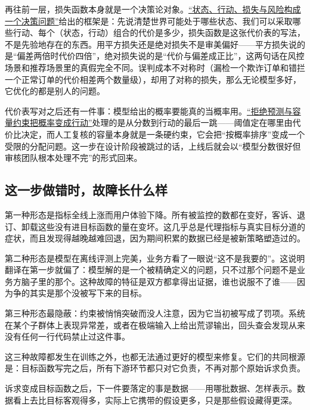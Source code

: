 再往前一层，损失函数本身就是一个决策论对象。\hyperref[sec:11-Mathematical-Statistics/07-Statistical-Decision-and-Reliable-Prediction/01]{``状态、行动、损失与风险构成一个决策问题''}给出的框架是：先说清楚世界可能处于哪些状态、我们可以采取哪些行动、每个（状态，行动）组合的代价是多少，损失函数是这张代价表的写法，不是先验地存在的东西。用平方损失还是绝对损失不是审美偏好——平方损失说的是``偏差两倍时代价四倍''，绝对损失说的是``代价与偏差成正比''，这两句话在风控场景和推荐场景里的真假完全不同。误判成本不对称时（漏检一个欺诈订单和错拦一个正常订单的代价相差两个数量级），却用了对称的损失，那么无论模型多好，它优化的都是别人的问题。

代价表写对之后还有一件事：模型给出的概率要能真的当概率用。\hyperref[sec:11-Mathematical-Statistics/07-Statistical-Decision-and-Reliable-Prediction/06]{``拒绝预测与容量约束把概率变成行动''}处理的是从分数到行动的最后一跳——阈值定在哪里由代价比决定，而人工复核的容量本身就是一条硬约束，它会把``按概率排序''变成一个受限的分配问题。这一步在设计阶段被跳过的话，上线后就会以``模型分数很好但审核团队根本处理不完''的形式回来。

\subsection{这一步做错时，故障长什么样}

第一种形态是指标全线上涨而用户体验下降。所有被监控的数都在变好，客诉、退订、卸载这些没有进目标函数的量在变坏。这几乎总是代理指标与真实目标分道的症状，而且发现得越晚越难回退，因为期间积累的数据已经是被新策略塑造过的。

第二种形态是模型在离线评测上完美，业务方看了一眼说``这不是我要的''。这说明翻译在第一步就偏了：模型解的是一个被精确定义的问题，只不过那个问题不是业务方脑子里的那个。这种故障的特征是双方都拿得出证据，谁也说服不了谁——因为争的其实是那个没被写下来的目标。

第三种形态最隐蔽：约束被悄悄突破而没人注意，因为它当初被写成了罚项。系统在某个子群体上表现异常差，或者在极端输入上给出荒谬输出，回头查会发现从来没有任何一行代码禁止过这件事。

这三种故障都发生在训练之外，也都无法通过更好的模型来修复。它们的共同根源是：目标函数写完之后，所有下游环节都只对它负责，不再对那个原始诉求负责。

诉求变成目标函数之后，下一件要落定的事是数据——用哪批数据、怎样表示。数据看上去比目标客观得多，实际上它携带的假设更多，只是那些假设藏得更深。
